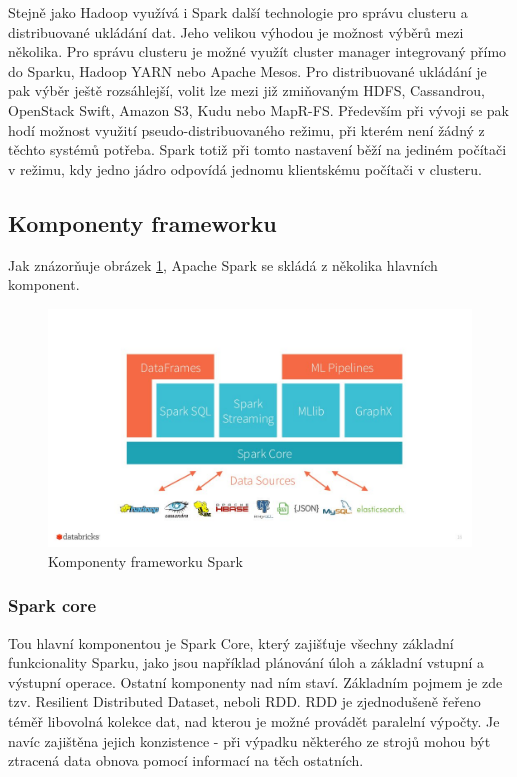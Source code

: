\documentclass[thesis=B,czech]{FITthesis}[2012/06/26]
\begin{document}
	Stejně jako Hadoop využívá i Spark další technologie pro správu clusteru a distribuované ukládání dat. Jeho velikou výhodou je možnost výběrů mezi několika. Pro správu clusteru je možné využít cluster manager integrovaný přímo do Sparku, Hadoop YARN nebo Apache Mesos. Pro distribuované ukládání je pak výběr ještě rozsáhlejší, volit lze mezi již zmiňovaným HDFS, Cassandrou, OpenStack Swift, Amazon S3, Kudu nebo MapR-FS. Především při vývoji se pak hodí možnost využití pseudo-distribuovaného režimu, při kterém není žádný z těchto systémů potřeba. Spark totiž při tomto nastavení běží na jediném počítači v režimu, kdy jedno jádro odpovídá jednomu klientskému počítači v clusteru. 

\subsection{Komponenty frameworku}
	Jak znázorňuje obrázek \ref{fig:spark_components}, Apache Spark se skládá z několika hlavních komponent. 
	\begin{figure}[ht]
    	\centering
    	\includegraphics[width=1\textwidth]{images/spark_engine.jpg}
    	\caption{Komponenty frameworku Spark\cite{spark-components}}
    	\label{fig:spark_components}
	\end{figure}
	
\subsubsection{Spark core}
	Tou hlavní komponentou je Spark Core, který zajišťuje všechny základní funkcionality Sparku, jako jsou například plánování úloh a základní vstupní a výstupní operace. Ostatní komponenty nad ním staví. Základním pojmem je zde tzv. Resilient Distributed Dataset, neboli RDD. RDD je zjednodušeně řeřeno téměř libovolná kolekce dat, nad kterou je možné provádět paralelní výpočty. Je navíc zajištěna jejich konzistence - při výpadku některého ze strojů mohou být ztracená data obnova pomocí informací na těch ostatních. 
	
\end{document}
